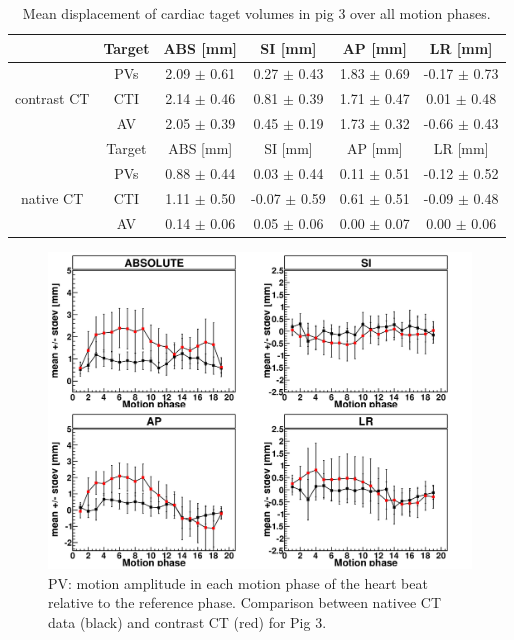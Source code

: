 \documentclass[type=dr, dr=rernat, accentcolor=tud7b,colorbacktitle, bigchapter, openright, twoside, 12pt ]{tudthesis}
\begin{document}
\begin{table}[H]
  \centering
  \small
  \caption{Mean displacement of cardiac taget volumes in pig 3 over all motion phases.}
  \begin{tabular}{|c|c|c|c|c|c|}
    \hline\hline
    & Target & ABS [mm] & SI [mm] & AP [mm] & LR [mm] \\
    \hline
    & PVs & 2.09 $\pm$ 0.61 & 0.27 $\pm$ 0.43 & 1.83 $\pm$ 0.69 &  -0.17 $\pm$ 0.73 \\
    contrast CT & CTI & 2.14 $\pm$ 0.46 & 0.81 $\pm$ 0.39 & 1.71 $\pm$ 0.47 & 0.01 $\pm$ 0.48 \\
    & AV & 2.05 $\pm$ 0.39 & 0.45 $\pm$ 0.19 & 1.73 $\pm$ 0.32 & -0.66 $\pm$ 0.43 \\
    \hline\hline
    & Target & ABS [mm] & SI [mm] & AP [mm] & LR [mm] \\
   \hline
    & PVs & 0.88 $\pm$ 0.44 & 0.03 $\pm$ 0.44 & 0.11 $\pm$ 0.51 & -0.12 $\pm$ 0.52 \\
    native CT & CTI & 1.11 $\pm$ 0.50 & -0.07 $\pm$ 0.59 & 0.61 $\pm$ 0.51 & -0.09 $\pm$ 0.48 \\
    & AV & 0.14 $\pm$ 0.06 & 0.05 $\pm$ 0.06 & 0.00 $\pm$ 0.07 & 0.00 $\pm$ 0.06 \\
    \hline\hline
  \end{tabular}
  \label{tab:motion_native_vs_contrast}
\end{table}

\vspace*{0.8cm}


\begin{figure}[H]
\begin{center}
 \includegraphics[scale=0.22]{Mayo_IPV_HB_NATIV_VS_CONTRAST.png}
\caption{PV: motion amplitude in each motion phase of the heart beat relative to the reference phase. Comparison between nativee CT data 
(black) and contrast CT (red) for Pig 3.}
\label{motion_hb_pv_contrast_native}
\end{center}
\end{figure}
\end{document}
